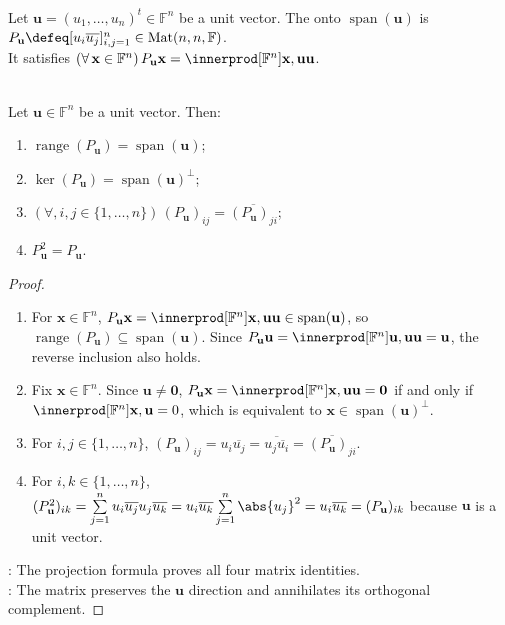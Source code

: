 \begin{definition} \label{def:rank-one-projection-matrix} \\
Let $\mathbf{u}=(u_1,\ldots,u_n)^t\in\mathbb{F}^n$ be a unit vector. The  onto $\operatorname{span}(\mathbf{u})$ is $P_{\mathbf{u}}\defeq[u_i\overline{u_j}]_{i,j=1}^{n}\in\operatorname{Mat}(n,n,\mathbb{F})$.\\
It satisfies $(\forall\,\mathbf{x}\in\mathbb{F}^n)\,P_{\mathbf{u}}\mathbf{x}=\innerprod[\mathbb{F}^n]{\mathbf{x},\mathbf{u}}\mathbf{u}$.
\end{definition}

\begin{proposition} \label{prop:rank-one-projection-matrix-properties} \\
Let $\mathbf{u}\in\mathbb{F}^n$ be a unit vector. Then:
\begin{enumerate}[label=(\roman*)]
\setlength{\itemsep}{0pt}
\item $\operatorname{range}(P_{\mathbf{u}})=\operatorname{span}(\mathbf{u})$;
\item $\ker(P_{\mathbf{u}})=\operatorname{span}(\mathbf{u})^{\perp}$;
\item $(\forall,i,j\in\{1,\ldots,n\})\,(P_{\mathbf{u}})_{ij}=\overline{(P_{\mathbf{u}})_{ji}}$;
\item $P_{\mathbf{u}}^2=P_{\mathbf{u}}$.
\end{enumerate}
\begin{proof}
\begin{enumerate}[label=(\roman*)]
\setlength{\itemsep}{0pt}
\item For $\mathbf{x}\in\mathbb{F}^n$, $P_{\mathbf{u}}\mathbf{x}=\innerprod[\mathbb{F}^n]{\mathbf{x},\mathbf{u}}\mathbf{u}\in\operatorname{span}(\mathbf{u})$, so $\operatorname{range}(P_{\mathbf{u}})\subseteq\operatorname{span}(\mathbf{u})$. Since $P_{\mathbf{u}}\mathbf{u}=\innerprod[\mathbb{F}^n]{\mathbf{u},\mathbf{u}}\mathbf{u}=\mathbf{u}$, the reverse inclusion also holds.
\item Fix $\mathbf{x}\in\mathbb{F}^n$. Since $\mathbf{u}\neq\mathbf{0}$, $P_{\mathbf{u}}\mathbf{x}=\innerprod[\mathbb{F}^n]{\mathbf{x},\mathbf{u}}\mathbf{u}=\mathbf{0}$ if and only if $\innerprod[\mathbb{F}^n]{\mathbf{x},\mathbf{u}}=0$, which is equivalent to $\mathbf{x}\in\operatorname{span}(\mathbf{u})^{\perp}$.
\item For $i,j\in\{1,\ldots,n\}$, $(P_{\mathbf{u}})_{ij}=u_i\overline{u_j}=\overline{u_j\overline{u_i}}=\overline{(P_{\mathbf{u}})_{ji}}$.
\item For $i,k\in\{1,\ldots,n\}$, $(P_{\mathbf{u}}^2)_{ik}=\sum\limits_{j=1}^{n}u_i\overline{u_j}u_j\overline{u_k}=u_i\overline{u_k}\sum\limits_{j=1}^{n}\abs{u_j}^2=u_i\overline{u_k}=(P_{\mathbf{u}})_{ik}$ because $\mathbf{u}$ is a unit vector.
\end{enumerate}
: The projection formula proves all four matrix identities.\\
: The matrix preserves the $\mathbf{u}$ direction and annihilates its orthogonal complement.
\end{proof}
\end{proposition}

